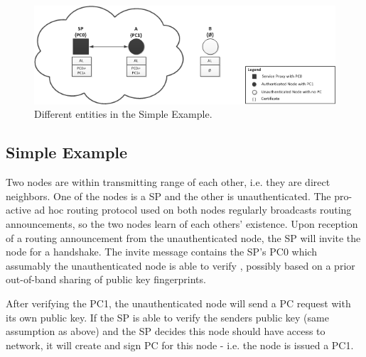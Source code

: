 \begin{figure}[h]
	\centering
  	\includegraphics[width=\textwidth]{images/simple_example_entities.png}
  	\caption{Different entities in the Simple Example.}
	\label{fig:simple_example_entities}
\end{figure}

\subsection{Simple Example}
Two nodes are within transmitting range of each other, i.e. they are direct
neighbors. One of the nodes is a \ac{SP} and the other is unauthenticated. The
pro-active ad hoc routing protocol used on both nodes regularly broadcasts
routing announcements, so the two nodes learn of each others' existence. Upon
reception of a routing announcement from the unauthenticated node, the \ac{SP}
will invite the node for a handshake. The invite message contains the \ac{SP}'s
\ac{PC0} which assumably the unauthenticated node is able to verify , possibly
based on a prior out-of-band sharing of public key fingerprints.

After verifying the \ac{PC1}, the unauthenticated node will send a \ac{PC}
request with its own public key. If the \ac{SP} is able to verify the senders
public key (same assumption as above) and the \ac{SP} decides this node should
have access to network, it will create and sign \ac{PC} for this node - i.e. the
node is issued a \ac{PC1}.



